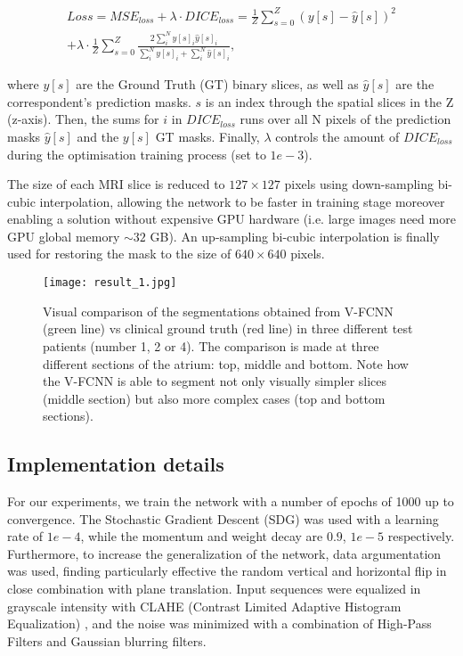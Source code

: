 \documentclass{llncs}
\begin{document}
\begin{equation}
\begin{split}
 Loss =  MSE_{loss} + \lambda\cdot DICE_{loss} =  \frac{1}{Z} \sum_{s=0}^{Z} (y[s]-\hat{y}[s])^{2} \\
  + \lambda\cdot  \frac{1}{Z} \sum_{s=0}^{Z} \frac{2\sum_{i}^{N} y[s]_{i}\hat{y}[s]_{i}}{\sum_{i}^{N} y[s]_{i} + \sum_{i}^{N} \hat{y}[s]_{i}},
\end{split}
\end{equation}

where $y[s]$ are the Ground Truth (GT) binary slices, as well as $\hat{y}[s]$ are the correspondent's prediction masks. $s$ is an index through the spatial slices in the Z (z-axis).
Then, the sums for $i$ in $DICE_{loss}$ runs over all N pixels of the prediction masks $\hat{y}[s]$ and the $y[s]$ GT masks. Finally, $\lambda$ controls the amount of $DICE_{loss}$ during the optimisation training process (set to $1e-3$).

The size of each MRI slice is reduced to $127\times127$ pixels using down-sampling bi-cubic interpolation, allowing the network to be faster in training stage moreover enabling a solution without expensive GPU hardware (i.e. large images need more GPU global memory $\sim 32$ GB). An up-sampling bi-cubic interpolation is finally used for restoring the mask to the size of $640\times640$ pixels.

 \begin{figure*}[ht]
\centering
 \texttt{[image: result\_1.jpg]}
   \caption{Visual comparison of the segmentations obtained from V-FCNN (green line) vs clinical ground truth (red line) in three different test patients (number 1, 2 or 4). The comparison is made at three different sections of the atrium: top, middle and bottom. Note how the V-FCNN is able to segment not only visually simpler slices (middle section) but also more complex cases (top and bottom sections).}
\label{fig:fig2}
\end{figure*}


\subsection{Implementation details}

For our experiments, we train the network with a number of epochs of 1000 up to convergence. The Stochastic Gradient Descent (SDG) was used with a  learning rate of $1e-4$, while the momentum and weight decay are $0.9$, $1e-5$ respectively. Furthermore, to increase the generalization of the network, data argumentation was used, finding particularly effective the random vertical and horizontal flip in close combination with plane translation. Input sequences were equalized in grayscale intensity with CLAHE (Contrast Limited Adaptive Histogram Equalization) \cite{Kaur}, and the noise was minimized with a combination of High-Pass Filters and Gaussian blurring filters.
\end{document}
